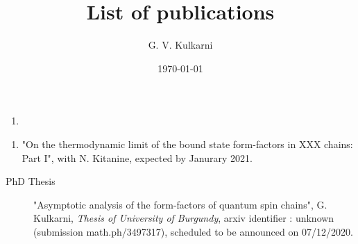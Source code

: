 \documentclass{scrarticle}
\title{List of publications}
\author{G. V. Kulkarni}
\date{\today}
\begin{document}
\maketitle
{}
\begin{enumerate}
    \item {}
\end{enumerate}
\begin{enumerate}
    \item "On the thermodynamic limit of the bound state form-factors in XXX chains: Part I", with N. Kitanine, expected by Janurary 2021.
\end{enumerate}
\begin{description}
\item[PhD Thesis]
"Asymptotic analysis of the form-factors of quantum spin chains", G. Kulkarni, \emph{Thesis of University of Burgundy}, arxiv identifier : unknown (submission math.ph/3497317), scheduled to be announced on 07/12/2020. 
\end{description}
\end{document}
